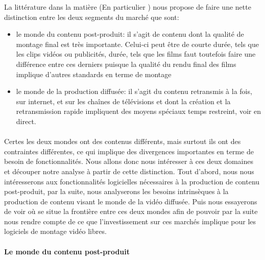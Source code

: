 La littérature dans la matière (En particulier
\cite{WorldVideoNonlinearEditingMarket}) nous propose de faire une nette
distinction entre  les deux segments du marché que sont:

\begin{itemize} \setlength{\itemsep}{2mm}

  \item {le monde du contenu post-produit: il s'agit de contenu dont la
  qualité de
    montage final est très importante. Celui-ci peut être de courte
    durée, tels que les clips vidéos ou publicités, %
    durée, tels que les films%
    faut toutefois faire une différence entre ces derniers puisque la
    qualité du rendu final des films implique d'autres standards en
    terme de montage}

  \item {le monde de la production diffusée: il s'agit du contenu
  retransmis à la fois,
    sur internet, et sur les chaînes de télévisions et dont la
    création et la retransmission rapide impliquent des moyens spéciaux
    temps restreint, voir en direct.}

\end{itemize}

\paragraph{}

Certes les deux mondes ont des contenus différents, mais surtout
ils ont des contraintes différentes, ce qui implique des divergences
importantes en terme de besoin de fonctionnalités. Nous allons donc
nous intéresser à ces deux domaines et découper notre analyse à
partir de cette distinction. Tout d'abord, nous nous intéresserons aux
fonctionnalités logicielles nécessaires à la production de contenu
post-produit, par la suite, nous analyserons les besoins intrinsèques
à la production de contenu visant le monde de la vidéo diffusée. Puis
nous essayerons de voir où se situe la frontière entre ces deux mondes
afin de pouvoir par la suite nous rendre compte de ce que l'investissement
sur ces marchés implique pour les logiciels de montage vidéo libres.

\paragraph{Le monde du contenu post-produit}


